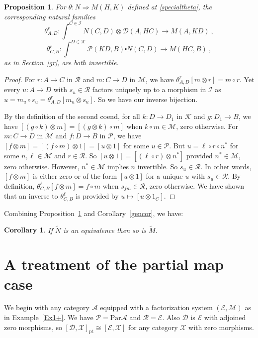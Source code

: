 \documentclass[a4paper,12pt,reqno]{amsart}
\newtheorem{proposition}[theorem]{Proposition}
\newtheorem{corollary}[theorem]{Corollary}
\theoremstyle{definition}
\theoremstyle{fact}
\theoremstyle{genquest}
\theoremstyle{step}
\newcommand{\dd}{\colon}
\newcommand{\lra}{\longrightarrow}
\newcommand{\ra}{\rightarrow}
\def\CA{{\mathscr A}}
\def\CD{{\mathscr D}}
\def\CE{{\mathscr E}}
\def\CI{{\mathscr I}}
\def\CK{{\mathscr K}}
\def\CM{{\mathscr M}}
\def\CP{{\mathscr P}}
\def\CR{{\mathscr R}}
\def\CX{{\mathscr X}}
\begin{document}
\begin{proposition}\label{twocoends}
For $\theta \dd N \Rightarrow M(H,K)$ defined at \eqref{specialtheta}, 
the corresponding natural families
$$\theta^r_{A,D} \dd \int^{C\in \CI}{N(C,D)\otimes \CD(A,HC)} \lra M(A,KD) \ ,$$
$$\theta^{\ell}_{C,B} \dd \int^{D\in \CK}{\CP(KD,B)\centerdot N(C,D)} \lra M(HC,B) \ ,$$
as in Section~\ref{gr}, are both invertible. 
\end{proposition}
\begin{proof}
For $r\dd A\ra C$ in $\CR$ and $m\dd C\ra D$ in $\CM$, 
we have $\theta^r_{A,D}[m\otimes r]= m\circ r$. 
Yet every $u\dd A\ra D$ with $s_u\in \CR$ factors uniquely up
to a morphism in $\CI$ as $u=m_u\circ s_u = \theta^r_{A,D}[m_u\otimes s_u]$.
So we have our inverse bijection.

By the definition of the second coend, for all $k\dd D\ra D_1$ in $\CK$ and 
$g\dd D_1\ra B$, we have $[(g\circ k)\otimes m] = [(g\otimes k)\circ m]$
when $k\circ m \in \CM$, zero otherwise.
For $m\dd C\ra D$ in $\CM$ and $f\dd D\ra B$ in $\CP$, we have
$[f\otimes m] = [(f\circ m)\otimes 1] = [u\otimes 1]$ for some $u \in \CP$.
But $u = \ell \circ r \circ n^*$ for some $n,\ell \in \CM$ and $r\in \CR$.
So $[u\otimes 1] = [(\ell \circ r)\otimes n^*]$ provided $n^*\in \CM$, zero
otherwise. However, $n^*\in \CM$ implies $n$ invertible. 
So $s_u\in \CR$. In other words, $[f\otimes m]$ is either zero or of the
form $[u\otimes 1]$ for a unique $u$ with $s_u\in \CR$.  
By definition, $\theta^{\ell}_{C,B}[f\otimes m]= f\circ m$ when $s_{fm}\in \CR$,
zero otherwise. 
We have shown that an inverse to $\theta^{\ell}_{C,B}$ is provided by 
$u \mapsto [u\otimes 1_C]$.
\end{proof}

Combining Proposition~\ref{twocoends} and Corollary~\ref{gencor}, we have:
 
\begin{corollary}
If $\widetilde{N}$ is an equivalence then so is $\widetilde{M}$.
\end{corollary}

\section{A treatment of the partial map case}\label{tpmc}

We begin with any category $\CA$ equipped with a 
factorization system $(\CE,\CM)$ as in Example~\ref{Ex1+}.
We have $\CP = \mathrm{Par}\CA$ and $\CR = \CE$.
Also $\CD$ is $\CE$ with adjoined zero morphisms, so 
$[\CD,\CX]_{\mathrm{pt}} \cong [\CE,\CX]$ for any category
$\CX$ with zero morphisms.  
\end{document}
